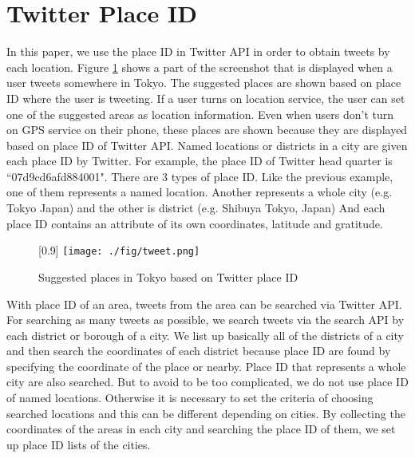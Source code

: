 \documentclass[twocolumn]{article}
\begin{document}
\vspace{-6mm}

\section{Twitter Place ID}\label{sec:placeid}
\vspace{-2mm}
In this paper, we use the place ID in Twitter API \cite{twitter_api_placeid} in order to obtain tweets by each location. 
Figure \ref{fig:tweet} shows a part of the screenshot that is displayed when a user tweets somewhere in Tokyo.
The suggested places are shown based on place ID where the user is tweeting.
If a user turns on location service, the user can set one of the suggested areas as location information. 
Even when users don't turn on GPS service on their phone, these places are shown because they are displayed based on place ID of Twitter API.
Named locations or districts in a city are given each place ID by Twitter.
For example, the place ID of Twitter head quarter is ``07d9cd6afd884001".
There are 3 types of place ID.
Like the previous example, one of them represents a named location.
Another represents a whole city (e.g. Tokyo Japan) and the other is district (e.g. Shibuya Tokyo, Japan)
And each place ID contains an attribute of its own coordinates, latitude and gratitude.

\begin{figure}
	\centering
	\scalebox{0.8}[0.9]{
	\texttt{[image: ./fig/tweet.png]}
	}
	\caption{Suggested places in Tokyo based on Twitter place ID}
	\label{fig:tweet}
\end{figure}

With place ID of an area, tweets from the area can be searched via Twitter API.
For searching as many tweets as possible, we search tweets via the search API by each district or borough of a city.
We list up basically all of the districts of a city and then search the coordinates of each district because place ID are found by specifying the coordinate of the place or nearby.
Place ID that represents a whole city are also searched.
But to avoid to be too complicated, we do not use place ID of named locations.
Otherwise it is necessary to set the criteria of choosing searched locations and this can be different depending on cities.
By collecting the coordinates of the areas in each city and searching the place ID of them, we set up place ID lists of the cities.
\end{document}
